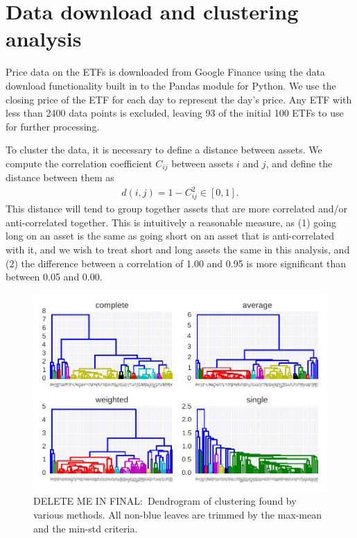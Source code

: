 \section{Data download and clustering analysis}

Price data on the ETFs is downloaded from Google Finance using the data download functionality built in to the Pandas module for Python.
We use the closing price of the ETF for each day to represent the day's price.
Any ETF with less than 2400 data points is excluded, leaving 93 of the initial 100 ETFs to use for further processing.

To cluster the data, it is necessary to define a distance between assets. We compute the correlation coefficient $C_{ij}$ between assets $i$ and $j$, and define the distance between them as
\begin{gather}
d(i,j) = 1 - C_{ij}^2  \in [0, 1].
\end{gather}
This distance will tend to group together assets that are more correlated and/or anti-correlated together.
This is intuitively a reasonable measure, as (1) going long on an asset is the same as going short on an asset that is anti-correlated with it, and we wish to treat short and long assets the same in this analysis, and (2) the difference between a correlation of 1.00 and 0.95 is more significant than between 0.05 and 0.00.


\begin{figure}[tp]
\centering
\includegraphics{pic/dendro_methods.pdf}
\caption{DELETE ME IN FINAL:\ Dendrogram of clustering found by various methods. All non-blue leaves are trimmed by the max-mean and the min-std criteria.}
\label{fig:bondsyield}
\end{figure}

